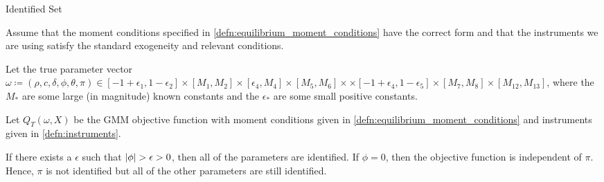 \documentclass[11pt, letterpaper, twoside, final]{article}
\begin{document}
\begin{lemma}{Identified Set}
    
    Assume that the moment conditions specified in \cref{defn:equilibrium_moment_conditions} have the correct form
    and that the instruments we are using satisfy the standard exogeneity and relevant conditions. 

    Let the true parameter vector $\omega \coloneqq (\rho, c, \delta, \phi, \theta, \pi) \in [-1+\epsilon_1,
    1 - \epsilon_2] \times [M_1, M_2] \times [\epsilon_4, M_4]\times [M_5, M_6]\times \times [-1 +
    \epsilon_4, 1 - \epsilon_5] \times [M_7, M_8] \times [M_12, M_13]$, where the $M_{\ast}$ are some large (in
    magnitude) known constants and the $\epsilon_{\ast}$ are some small positive constants.  

    Let $Q_T(\omega, X)$  be the GMM objective function with moment conditions given in
    \cref{defn:equilibrium_moment_conditions} and instruments given in  \cref{defn:instruments}.

    If there exists a $\epsilon$ such that $\lvert\phi\rvert > \epsilon > 0$, then all of the parameters are identified. 
    If $\phi = 0$, then the objective function is independent of $\pi$. 
    Hence, $\pi$ is not identified but all of the other parameters are still identified.

\end{lemma}
\end{document}
